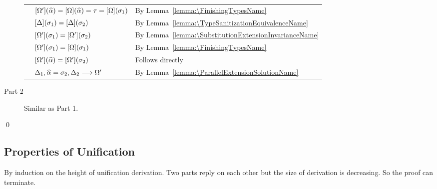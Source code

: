 \begin{description}
\begin{longtable}[l]{lll}
    & $[\Omega'](\widehat{\alpha}) = [\Omega](\widehat{\alpha})  = \tau = [\Omega](\sigma_1) $
    & By Lemma~\ref{lemma:\FinishingTypesName} \\
    & $[\Delta](\sigma_1) = [\Delta](\sigma_2)$
    & By Lemma~\ref{lemma:\TypeSanitizationEquivalenceName} \\
    & $[\Omega'](\sigma_1) = [\Omega'](\sigma_2)$
    & By Lemma~\ref{lemma:\SubstitutionExtensionInvarianceName} \\
    & $[\Omega'](\sigma_1) = [\Omega](\sigma_1)$
    & By Lemma~\ref{lemma:\FinishingTypesName} \\
    & $[\Omega'](\widehat{\alpha}) = [\Omega'](\sigma_2)$
    & Follows directly \\
    & $\Delta_1, \widehat{\alpha} = \sigma_2, \Delta_2 \longrightarrow \Omega'$
    & By Lemma~\ref{lemma:\ParallelExtensionSolutionName}
  \end{longtable}
\item [Part 2]
  Similar as Part 1.
\end{description}

\qed


\subsection{Properties of Unification}

\begin{lemma}[\UnificationExtensionName]\leavevmode
  \label{lemma:\UnificationExtensionName}
  \UnificationExtensionBody
\end{lemma}

\proof

By induction on the height of unification derivation.
Two parts reply on each
other but the size of derivation is decreasing.
So the proof can terminate.

